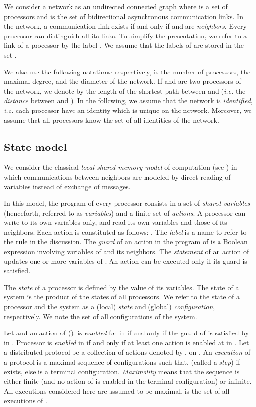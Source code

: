 \documentclass[11pt]{article}
\begin{document}
We consider a network as an undirected connected graph  where  is a set of processors and  is the set of bidirectional asynchronous communication links. In the network, a communication link  exists if and only if  and  are \emph{neighbors}. Every processor  can distinguish all its links. To simplify the presentation, we refer to a link  of a processor  by the label . We assume that the labels of  are stored in the set . 

We also use the following notations: respectively,  is the number of processors,  the maximal degree, and  the diameter of the network. If  and  are two processors of the network, we denote by  the length of the shortest path between  and  (\emph{i.e.} the \emph{distance} between  and ). In the following, we assume that the network is \emph{identified}, \emph{i.e.} each processor have an identity which is unique on the network. Moreover, we assume that all processors know the set  of all identities of the network.

\subsection{State model}\label{sub:State-model}

We consider the classical \emph{local shared memory model} of computation (see \cite{T01}) in which communications between neighbors are modeled by direct reading of variables instead of exchange of messages. 

In this model, the program of every processor consists in a set of \emph{shared variables} (henceforth, referred to as \emph{variables}) and a finite set of \emph{actions}. A processor can write to its own variables only, and read its own variables and those of its neighbors. Each action is constituted as follows: . The \emph{label} is a name to refer to the rule in the discussion. The \emph{guard} of an action in the program of  is a Boolean expression involving variables of  and its neighbors. The \emph{statement} of an action of  updates one or more variables of . An action can be executed only if its guard is satisfied.

The \emph{state} of a processor is defined by the value of its variables. The state of a system is the product of the states of all processors. We refer to the state of a processor and the system as a (local) \emph{state} and (global) \emph{configuration}, respectively. We note  the set of all configurations of the system. 

Let  and  an action of  ().  is \emph{enabled} for  in  if and only if the guard of  is satisfied by  in . Processor  is \emph{enabled} in  if and only if at least one action is enabled at  in . Let a distributed protocol  be a collection of actions denoted by , on . An \emph{execution} of a protocol  is a maximal sequence of configurations  such that,  (called a \emph{step}) if  exists, else  is a terminal configuration. \emph{Maximality} means that the sequence is either finite (and no action of  is enabled in the terminal configuration) or infinite. All executions considered here are assumed to be maximal.  is the set of all executions of .
\end{document}
